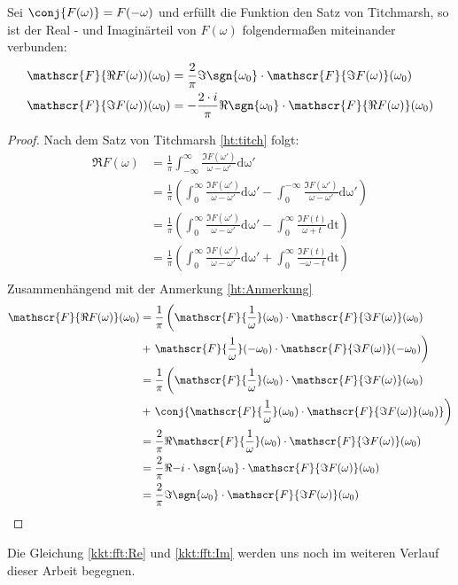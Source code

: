 \begin{kor}
Sei $\conj{F(\omega)} = F(-\omega)$  und erfüllt die Funktion den Satz von Titchmarsh, so ist der Real - und Imaginärteil von $F(\omega)$ folgendermaßen miteinander verbunden:
\begin{align}
	\mathscr{F}\{\Re{F(\omega)})(\omega_0) &= \frac{2}{\pi} \Im{ \sgn{\omega_0} \cdot  \mathscr{F}\{\Im{F(\omega)}\}(\omega_0)}\label{kkt:fft:Re}\\
	\mathscr{F}\{\Im{F(\omega)})(\omega_0) &= - \frac{2 \cdot i}{\pi} \Re{ \sgn{\omega_0} \cdot  \mathscr{F}\{\Re{F(\omega)}\}(\omega_0)}\label{kkt:fft:Im}
\end{align}
\begin{proof}
	Nach dem Satz von Titchmarsh \ref{ht:titch} folgt: 
	\begin{align}
		\Re{F(\omega)} &= \frac{1}{\pi} \int_{-\infty}^{\infty} \frac{\Im{F(\omega')}}{\omega - \omega'} \mathrm{d\omega'}\\
						 &= \frac{1}{\pi} \left(\int_{0}^{\infty} \frac{\Im{F(\omega')}}{\omega - \omega'} \mathrm{d\omega'} - \int_{0}^{-\infty} \frac{\Im{F(\omega')}}{\omega - \omega'} \mathrm{d\omega'}\right)\\
			&=\frac{1}{\pi} \left(\int_{0}^{\infty} \frac{\Im{F(\omega')}}{\omega - \omega'} \mathrm{d\omega'} - \int_{0}^{\infty} \frac{\Im{F(t)}}{\omega + t} \mathrm{dt}\right)\\
			&=\frac{1}{\pi} \left(\int_{0}^{\infty} \frac{\Im{F(\omega')}}{\omega - \omega'} \mathrm{d\omega'} + \int_{0}^{\infty} \frac{\Im{F(t)}}{-\omega - t} \mathrm{dt}\right)\\
	\end{align}
	Zusammenhängend mit der Anmerkung \ref{ht:Anmerkung}
	\begin{align}
		\mathscr{F}\{\Re{F(\omega)}\}(\omega_0) &=  \frac{1}{\pi} \left( \mathscr{F}\{\frac{1}{\omega}\}(\omega_0) \cdot  \mathscr{F}\{\Im{F(\omega)}\}(\omega_0) \right.\\
		&+  \left. \mathscr{F}\{\frac{1}{\omega}\}(-\omega_0) \cdot  \mathscr{F}\{\Im{F(\omega)}\}(-\omega_0)\right)\\
		&=  \frac{1}{\pi} \left( \mathscr{F}\{\frac{1}{\omega}\}(\omega_0) \cdot  \mathscr{F}\{\Im{F(\omega)}\}(\omega_0) \right.\\
		&+  \left. \conj{\mathscr{F}\{\frac{1}{\omega}\}(\omega_0) \cdot  \mathscr{F}\{\Im{F(\omega)}\}(\omega_0)}\right)\\
		&= \frac{2}{\pi} \Re{\mathscr{F}\{\frac{1}{\omega}\}(\omega_0) \cdot  \mathscr{F}\{\Im{F(\omega)}\}(\omega_0)}\\
		&= \frac{2}{\pi} \Re{-i \cdot \sgn{\omega_0} \cdot  \mathscr{F}\{\Im{F(\omega)}\}(\omega_0)}\\
		&= \frac{2}{\pi} \Im{ \sgn{\omega_0} \cdot  \mathscr{F}\{\Im{F(\omega)}\}(\omega_0)}
	\end{align}
\end{proof}
\end{kor}
Die Gleichung \ref{kkt:fft:Re} und \ref{kkt:fft:Im} werden uns noch im weiteren Verlauf dieser Arbeit begegnen.
\\\\

